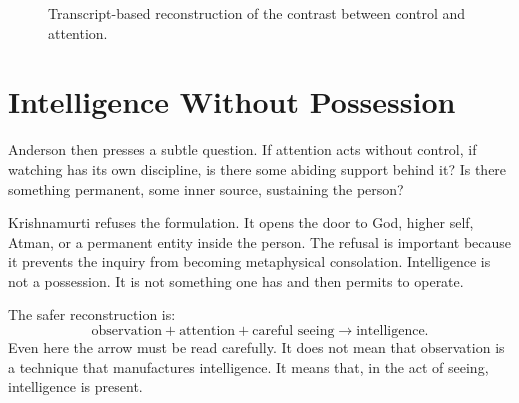 \begin{figure}
\centering
{}

Transcript-based reconstruction of the contrast between control and attention.
\end{figure}

\section{Intelligence Without Possession}

Anderson then presses a subtle question. If attention acts without control, if watching has its own discipline, is there some abiding support behind it? Is there something permanent, some inner source, sustaining the person?

Krishnamurti refuses the formulation. It opens the door to God, higher self, Atman, or a permanent entity inside the person. The refusal is important because it prevents the inquiry from becoming metaphysical consolation. Intelligence is not a possession. It is not something one has and then permits to operate.

The safer reconstruction is:
\begin{equation}
\text{observation} + \text{attention} + \text{careful seeing}
\longrightarrow
\text{intelligence}.
\end{equation}
Even here the arrow must be read carefully. It does not mean that observation is a technique that manufactures intelligence. It means that, in the act of seeing, intelligence is present.

